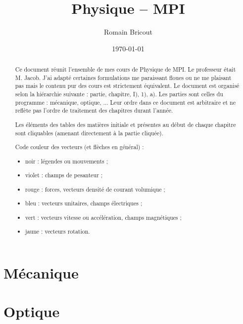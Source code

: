 \documentclass[a4paper,12pt]{report}
\title{Physique -- MPI}
\author{Romain Bricout}
\date{\today}
\newcommand{\ds}{\displaystyle}
\theoremstyle{break}
\theoremstyle{break}
\theoremstyle{break}
\theoremstyle{break}
\theoremstyle{break}
\theoremstyle{break}
\theoremstyle{break}
\theoremstyle{break}
\theoremstyle{break}
\theoremstyle{break}
\theoremstyle{break}
\theoremstyle{nonumberbreak}
\begin{document}
\renewcommand{\labelitemi}{\(\triangleright\)}
\renewcommand{\labelenumi}{(\arabic{enumi})}

\everymath{\ds}

\maketitle

\begin{abstract}
Ce document réunit l'ensemble de mes cours de Physique de MPI. Le professeur était M. Jacob. J'ai adapté certaines formulations me paraissant floues ou ne me plaisant pas mais le contenu pur des cours est strictement équivalent. Le document est organisé selon la hiérarchie suivante : partie, chapitre, I), 1), a). Les parties sont celles du programme : mécanique, optique, ... Leur ordre dans ce document est arbitraire et ne reflète pas l'ordre de traitement des chapitres durant l'année.

Les éléments des tables des matières initiale et présentes au début de chaque chapitre sont cliquables (amenant directement à la partie cliquée).

Code couleur des vecteurs (et flèches en général) : \begin{itemize}
\item noir : légendes ou mouvements ;
\item violet : champs de pesanteur ;
\item rouge : forces, vecteurs densité de courant volumique ;
\item bleu : vecteurs unitaires, champs électriques ;
\item vert : vecteurs vitesse ou accélération, champs magnétiques ;
\item jaune : vecteurs rotation. \\ %
\end{itemize}
\end{abstract}

\dominitoc\tableofcontents

\part{Mécanique}





\part{Optique}
\end{document}
